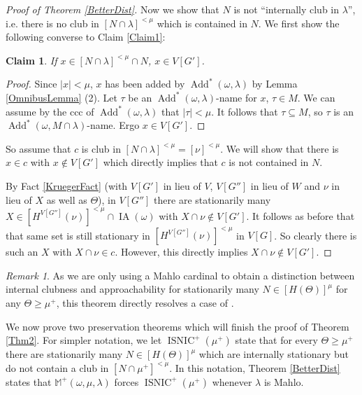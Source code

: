 \documentclass[12pt]{amsart}
\theoremstyle{definition}
\theoremstyle{remark}
\newtheorem{mybem}[mydef]{Remark}
\theoremstyle{plain}
\newtheorem{myclaim}{Claim}
\numberwithin{mydef}{section}
\DeclareMathOperator{\Add}{Add}
\DeclareMathOperator{\IA}{IA}
\DeclareMathOperator{\ISNIC}{ISNIC}
\newcommand{\dM}{\mathbb{M}}
\begin{document}
\begin{proof}[Proof of Theorem \ref{BetterDist}]
		Now we show that $N$ is not ``internally club in $\lambda$'', i.e. there is no club in $[N\cap\lambda]^{<\mu}$ which is contained in $N$. We first show the following converse to Claim \ref{Claim1}:
		
		\begin{myclaim}
			If $x\in [N\cap\lambda]^{<\mu}\cap N$, $x\in V[G']$.
		\end{myclaim}
		
		\begin{proof}
			Since $|x|<\mu$, $x$ has been added by $\Add^*(\omega,\lambda)$ by Lemma \ref{OmnibusLemma} (2). Let $\tau$ be an $\Add^*(\omega,\lambda)$-name for $x$, $\tau\in M$. We can assume by the ccc of $\Add^*(\omega,\lambda)$ that $|\tau|<\mu$. It follows that $\tau\subseteq M$, so $\tau$ is an $\Add^*(\omega,M\cap\lambda)$-name. Ergo $x\in V[G']$.
		\end{proof}
		
		So assume that $c$ is club in $[N\cap\lambda]^{<\mu}=[\nu]^{<\mu}$. We will show that there is $x\in c$ with $x\notin V[G']$ which directly implies that $c$ is not contained in $N$.
		
		By Fact \ref{KruegerFact} (with $V[G']$ in lieu of $V$, $V[G'']$ in lieu of $W$ and $\nu$ in lieu of $X$ as well as $\Theta$), in $V[G'']$ there are stationarily many $X\in[H^{V[G'']}(\nu)]^{<\mu}\cap\IA(\omega)$ with $X\cap\nu\notin V[G']$. It follows as before that that same set is still stationary in $[H^{V[G'']}(\nu)]^{<\mu}$ in $V[G]$. So clearly there is such an $X$ with $X\cap\nu\in c$. However, this directly implies $X\cap\nu\notin V[G']$.
	\end{proof}
	
	\begin{mybem}
		As we are only using a Mahlo cardinal to obtain a distinction between internal clubness and approachability for stationarily many $N\in[H(\Theta)]^{\mu}$ for any $\Theta\geq\mu^+$, this theorem directly resolves a case of \cite[Question 12.7]{KruegerApplicMSI}.
	\end{mybem}
	
	We now prove two preservation theorems which will finish the proof of Theorem \ref{Thm2}. For simpler notation, we let $\ISNIC^+(\mu^+)$ state that for every $\Theta\geq\mu^+$ there are stationarily many $N\in[H(\Theta)]^{\mu}$ which are internally stationary but do not contain a club in $[N\cap\mu^+]^{<\mu}$. In this notation, Theorem \ref{BetterDist} states that $\dM^+(\omega,\mu,\lambda)$ forces $\ISNIC^+(\mu^+)$ whenever $\lambda$ is Mahlo.
	
\end{document}
